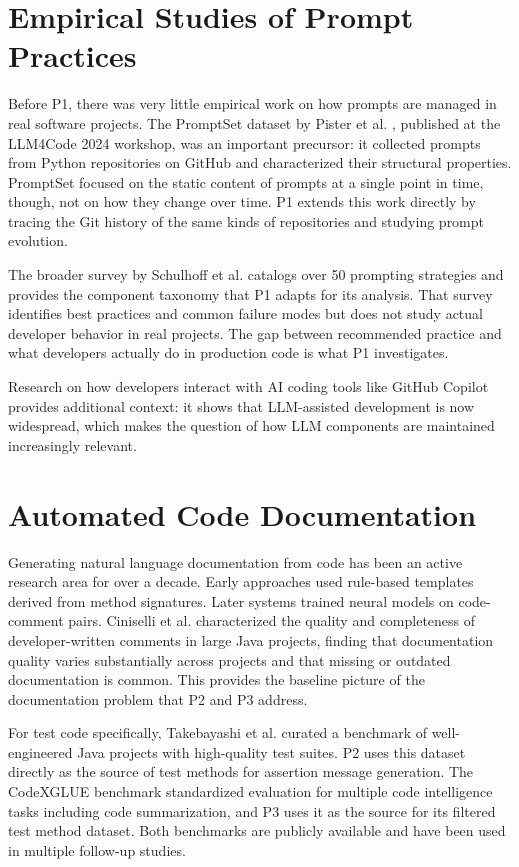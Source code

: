 \documentclass[
    pdftex,
    final,
    11pt,
    a4paper,
    parskip=false,
    oneside,
    footheight=0mm,
    footinclude=false,
    toc=bibliography
]{scrbook}
\begin{document}
\section{Empirical Studies of Prompt Practices}

Before P1, there was very little empirical work on how prompts are managed in real software projects. The PromptSet dataset by Pister et al. \cite{Pister2024}, published at the LLM4Code 2024 workshop, was an important precursor: it collected prompts from Python repositories on GitHub and characterized their structural properties. PromptSet focused on the static content of prompts at a single point in time, though, not on how they change over time. P1 extends this work directly by tracing the Git history of the same kinds of repositories and studying prompt evolution.

The broader survey by Schulhoff et al. \cite{Schulhoff2024} catalogs over 50 prompting strategies and provides the component taxonomy that P1 adapts for its analysis. That survey identifies best practices and common failure modes but does not study actual developer behavior in real projects. The gap between recommended practice and what developers actually do in production code is what P1 investigates.

Research on how developers interact with AI coding tools like GitHub Copilot \cite{Ziegler2022} provides additional context: it shows that LLM-assisted development is now widespread, which makes the question of how LLM components are maintained increasingly relevant.

\section{Automated Code Documentation}

Generating natural language documentation from code has been an active research area for over a decade. Early approaches used rule-based templates derived from method signatures. Later systems trained neural models on code-comment pairs. Ciniselli et al. \cite{Ciniselli2021} characterized the quality and completeness of developer-written comments in large Java projects, finding that documentation quality varies substantially across projects and that missing or outdated documentation is common. This provides the baseline picture of the documentation problem that P2 and P3 address.

For test code specifically, Takebayashi et al. \cite{Takebayashi2023} curated a benchmark of well-engineered Java projects with high-quality test suites. P2 uses this dataset directly as the source of test methods for assertion message generation. The CodeXGLUE benchmark \cite{Lu2021} standardized evaluation for multiple code intelligence tasks including code summarization, and P3 uses it as the source for its filtered test method dataset. Both benchmarks are publicly available and have been used in multiple follow-up studies.
\end{document}
